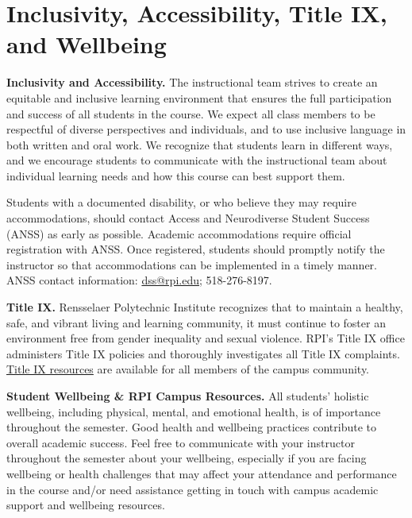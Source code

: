 \section*{Inclusivity, Accessibility, Title IX, and Wellbeing}
\textbf{Inclusivity and Accessibility.} The instructional team strives to create an equitable and inclusive learning environment that ensures the full participation and success of all students in the course. We expect all class members to be respectful of diverse perspectives and individuals, and to use inclusive language in both written and oral work. We recognize that students learn in different ways, and we encourage students to communicate with the instructional team about individual learning needs and how this course can best support them.

Students with a documented disability, or who believe they may require accommodations, should contact Access and Neurodiverse Student Success (ANSS) as early as possible. Academic accommodations require official registration with ANSS. Once registered, students should promptly notify the instructor so that accommodations can be implemented in a timely manner. ANSS contact information: \href{mailto:dss@rpi.edu}{dss@rpi.edu}; 518-276-8197.

\textbf{Title IX.} Rensselaer Polytechnic Institute recognizes that to maintain a healthy, safe, and vibrant living and learning community, it must continue to foster an environment free from gender inequality and sexual violence. RPI's Title IX office administers Title IX policies and thoroughly investigates all Title IX complaints. \href{https://sexualviolence.rpi.edu/resources}{Title IX resources} are available for all members of the campus community.

\textbf{Student Wellbeing \& RPI Campus Resources.} All students' holistic wellbeing, including physical, mental, and emotional health, is of importance throughout the semester. Good health and wellbeing practices contribute to overall academic success. Feel free to communicate with your instructor throughout the semester about your wellbeing, especially if you are facing wellbeing or health challenges that may affect your attendance and performance in the course and/or need assistance getting in touch with campus academic support and wellbeing resources.

{\small}
